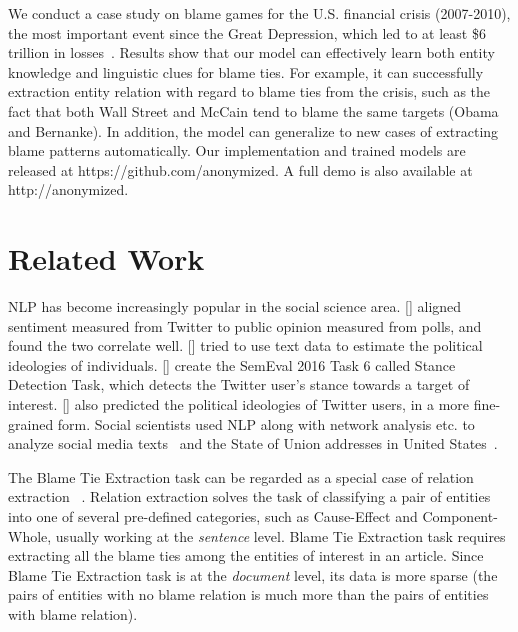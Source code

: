 \documentclass[letterpaper]{article} %
\begin{document}
We conduct a case study on blame games for the U.S. financial crisis (2007-2010), the most important event since the Great Depression, which led to at least \$6 trillion in losses~\cite{luttrell2013assessing}. Results show that our model can effectively learn both entity knowledge and linguistic clues for blame ties. For example, it can successfully extraction entity relation with regard to blame ties from the crisis, such as the fact that both Wall Street and McCain tend to blame the same targets (Obama and Bernanke). In addition, the model can generalize to new cases of extracting blame patterns automatically. Our implementation and trained models are released at https://github.com/anonymized. A full demo is also available at http://anonymized.

\section{Related Work}
\label{task}

NLP has become increasingly popular in the social science area. \citeauthor{o2010tweets} [\citeyear{o2010tweets}] aligned sentiment measured from Twitter to public opinion measured from polls, and found the two correlate well. \citeauthor{bamman2015open} [\citeyear{bamman2015open}] tried to use text data to estimate the political ideologies of individuals. \citeauthor{mohammad-EtAl:2016:SemEval} [\citeyear{mohammad-EtAl:2016:SemEval}] create the SemEval 2016 Task 6 called Stance Detection Task, which detects the Twitter user's stance towards a target of interest. \citeauthor{preoctiuc2017beyond} [\citeyear{preoctiuc2017beyond}] also predicted the political ideologies of Twitter users, in a more fine-grained form. Social scientists used NLP along with network analysis etc. to analyze social media texts~\cite{rule2015lexical} and the State of Union addresses in United States~\cite{bail2016combining}.

The Blame Tie Extraction task can be regarded as a special case of relation extraction ~\cite{miwa2016end}. Relation extraction solves the task of classifying a pair of entities into one of several pre-defined categories, such as Cause-Effect and Component-Whole, usually working at the {\it sentence} level. Blame Tie Extraction task requires extracting all the blame ties among the entities of interest in an article. Since Blame Tie Extraction task is at the {\it document} level, its data is more sparse (the pairs of entities with no blame relation is much more than the pairs of entities with blame relation).
\end{document}
